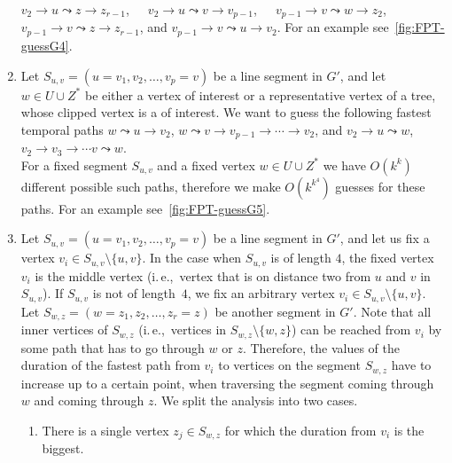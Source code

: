 \documentclass[a4paper,UKenglish,cleveref, autoref, thm-restate]{lipics-v2021}
\newcommand{\ie}{i.\,e.,\ }
\begin{document}
\begin{enumerate}[G-1.]
    ${v_2 \rightarrow u \leadsto z \rightarrow z_{r-1}}$,\ \ \ 
    ${v_2 \rightarrow u \leadsto v \rightarrow v_{p-1}}$,\ \ \  
    ${v_{p-1} \rightarrow v \leadsto w \rightarrow z_{2}}$,\ \ \  
    ${v_{p-1} \rightarrow v \leadsto z \rightarrow z_{r-1}}$, and  
    ${v_{p-1} \rightarrow v \leadsto u \rightarrow v_{2}}$.
    For an example see~\cref{fig:FPT-guessG4}.
    \item \label{FPT:guess-uToSegmentz2}
    Let $S_{u,v} = (u=v_1,v_2, \dots, v_p = v)$ be a line segment in $G'$,
    and let $w \in U \cup Z^*$ be either a vertex of interest or a representative vertex of a tree, whose clipped vertex is a  of interest.
    We want to
    guess the following fastest temporal paths
    $w \leadsto u \rightarrow v_2$, $w \leadsto v \rightarrow v_{p-1} \rightarrow \cdots \rightarrow v_2$,
    and
    $v_2 \rightarrow u \leadsto w$, $v_2 \rightarrow v_3 \rightarrow \cdots v \leadsto w$.
    \\
    For a fixed segment $S_{u,v}$ and a fixed vertex $w \in U \cup Z^*$ we have $O(k^k)$ different possible such paths, therefore we make $O(k^{k^4})$ guesses for these paths.
    For an example see~\cref{fig:FPT-guessG5}.
    \item \label{FPT:guess-splitFromAnotherSegmentAndPaths}
    Let $S_{u,v} = (u=v_1,v_2, \dots, v_p = v)$ be a line segment in $G'$, and let us
    fix a vertex $v_i \in S_{u,v} \setminus \{u,v\}$.
    In the case when $S_{u,v}$ is of length $4$, the fixed vertex $v_i$ is the middle vertex (\ie vertex that is on distance two from $u$ and $v$ in $S_{u,v}$).
    If $S_{u,v}$ is not of length~$4$, we fix an arbitrary vertex $v_i \in S_{u,v} \setminus \{u,v\}$.
    Let 
    $S_{w,z} = (w=z_1,z_2, \dots, z_r = z)$ be another segment in $G'$.
    Note that all inner vertices of $S_{w,z}$ (\ie vertices in $S_{w,z} \setminus \{w,z\}$)
    can be reached from $v_i$ by some path that has to go through $w$ or $z$.
    Therefore, the values of the duration of the fastest path from $v_i$ to vertices on 
    the segment
    $S_{w,z}$ have to increase up to a certain point, when traversing the segment coming through $w$ and coming through $z$.
    We split the analysis into two cases.
    \begin{enumerate}
        \item 
    There is a single vertex $z_j \in S_{w,z}$ for which the duration from $v_i$ is the biggest.

\end{enumerate}
\end{enumerate}
\end{document}
